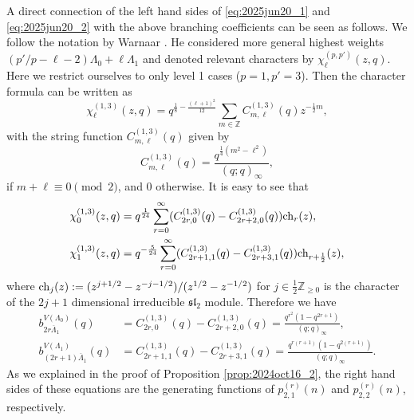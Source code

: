 \documentclass[sn-mathphys-num]{sn-jnl}%
\newcommand{\red}[1]{\textcolor{black}{#1}}
\theoremstyle{thmstyleone}%
\theoremstyle{thmstyletwo}%
\theoremstyle{thmstylethree}%
\begin{document}
\begin{appendices}
A direct connection of the left hand sides of \eqref{eq:2025jun20_1} and
\eqref{eq:2025jun20_2} with the above branching coefficients can be seen as follows.
We follow the notation by Warnaar \cite{Warnaar2001}.
He considered more general highest weights $(p'/p - \ell - 2) \Lambda_0 + \ell \Lambda_1$
and denoted relevant characters by $\chi_\ell^{(p,p')}(z,q)$.
Here we restrict ourselves to only level 1 cases ($p=1, p'=3$).
Then the character formula can be written as
\begin{equation*}
\chi_\ell^{(1,3)}(z,q) = q^{\frac18 -\frac{(\ell + 1)^2}{12}} \sum_{m \in \mathbb{Z}}
C^{(1,3)}_{m,\ell}(q) z^{-\frac12 m},
\end{equation*}
with the string function $C^{(1,3)}_{m,\ell}(q)$ given by
\begin{equation*}
C^{(1,3)}_{m,\ell}(q) = \frac{q^{\frac14 (m^2 - \ell^2)}}{(q;q)_\infty},
\end{equation*}
if $m+\ell \equiv 0 \pmod{2}$, and $0$ otherwise.
It is easy to see that
\begin{align*}
\chi_0^{(1,3)}(z,q) &= q^{\frac{1}{24}} \sum_{r=0}^\infty (C^{(1,3)}_{2r,0}(q) - C^{(1,3)}_{2r+2,0}(q))
{\rm ch}_{r} (z),\\
\chi_1^{(1,3)}(z,q) &= q^{-\frac{5}{24}} \sum_{r=0}^\infty (C^{(1,3)}_{2r+1,1}(q) - C^{(1,3)}_{2r+3,1}(q))
{\rm ch}_{r+\frac12} (z),
\end{align*}
where ${\rm ch}_{j} (z) :=(z^{j+1/2} - z^{-j-1/2})/(z^{1/2} - z^{-1/2})$
for $j \in \frac12 \mathbb{Z}_{\geq 0}$ is the character of the $2j+1$ dimensional irreducible 
\red{$\mathfrak{sl}_2$} module.
Therefore we have
\begin{align*}
b^{V(\Lambda_0)}_{2r \overline{\Lambda}_1}(q) &= C^{(1,3)}_{2r,0}(q) - C^{(1,3)}_{2r+2,0}(q) =
\frac{q^{r^2}(1 - q^{2r+1})}{(q;q)_{\infty}},\\
b^{V(\Lambda_1)}_{(2r+1) \overline{\Lambda}_1} (q) &=
C^{(1,3)}_{2r+1,1}(q) - C^{(1,3)}_{2r+3,1}(q)= 
\frac{q^{r(r+1)}(1 - q^{2(r+1)})}{(q;q)_{\infty}}.
\end{align*}
As we explained in the proof of Proposition \ref{prop:2024oct16_2}, the right hand sides
of these equations are the generating functions of $p^{(r)}_{2,1}(n)$ and $p^{(r)}_{2,2}(n)$,
respectively.



\end{appendices}
\end{document}
